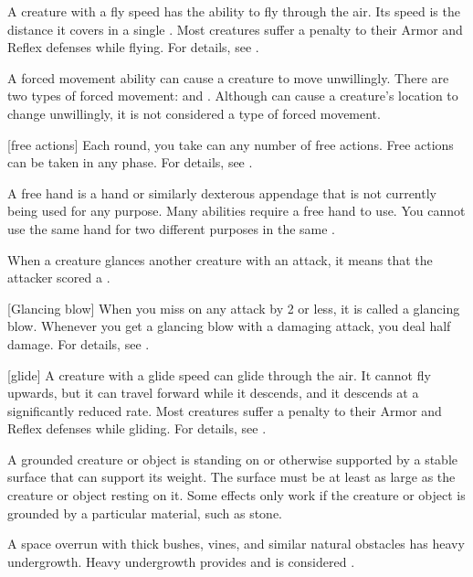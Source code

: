  A creature with a fly speed has the ability to fly through the air.
Its speed is the distance it covers in a single .
Most creatures suffer a  penalty to their Armor and Reflex defenses while flying.
For details, see .

 A forced movement ability can cause a creature to move unwillingly.
There are two types of forced movement:  and .
Although  can cause a creature's location to change unwillingly, it is not considered a type of forced movement.

[free actions] Each round, you take can any number of free actions.
Free actions can be taken in any phase.
For details, see .

 A free hand is a hand or similarly dexterous appendage that is not currently being used for any purpose.
Many abilities require a free hand to use.
You cannot use the same hand for two different purposes in the same .

 When a creature glances another creature with an attack, it means that the attacker scored a .

[Glancing blow] When you miss on any attack by 2 or less, it is called a glancing blow.
Whenever you get a glancing blow with a damaging attack, you deal half damage.
For details, see .

[glide] A creature with a glide speed can glide through the air.
It cannot fly upwards, but it can travel forward while it descends, and it descends at a significantly reduced rate.
Most creatures suffer a  penalty to their Armor and Reflex defenses while gliding.
For details, see .

 A grounded creature or object is standing on or otherwise supported by a stable surface that can support its weight.
The surface must be at least as large as the creature or object resting on it.
Some effects only work if the creature or object is grounded by a particular material, such as stone. 

 A space overrun with thick bushes, vines, and similar natural obstacles has heavy undergrowth.
Heavy undergrowth provides  and is considered .

